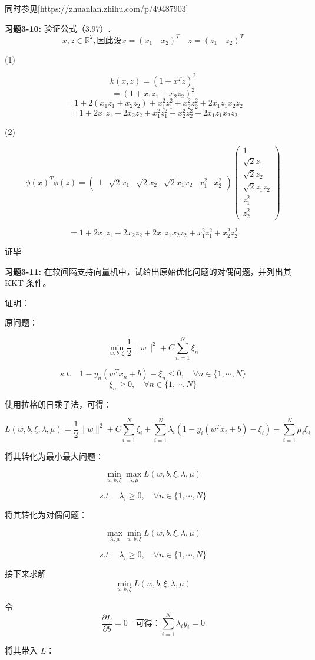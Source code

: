 同时参见[https://zhuanlan.zhihu.com/p/49487903]


\noindent\textbf{习题3-10:} 验证公式（3.97）.
\[x,z \in \mathbb{R}^2, 因此设 x = (x_1 \quad x_2)^T \quad z=(z_1 \quad z_2)^T\]

(1)

\[k(x,z) = (1 + x^Tz)^2\]
\[= (1 + x_1z_1 + x_2z_2)^2\]
\[= 1 + 2(x_1z_1 + x_2z_2) + x_1^2z_1^2 + x_2^2z_2^2 + 2x_1z_1x_2z_2\]
\[= 1 + 2x_1z_1 + 2x_2z_2 + x_1^2z_1^2 + x_2^2z_2^2 + 2x_1z_1x_2z_2\]

(2)

\[\phi(x)^T\phi(z) = \begin{pmatrix} 1 & \sqrt{2}x_1 & \sqrt{2}x_2 & \sqrt{2}x_1x_2 & x_1^2 & x_2^2 \end{pmatrix} \begin{pmatrix} 1 \\ \sqrt{2}z_1 \\ \sqrt{2}z_2 \\ \sqrt{2}z_1z_2 \\ z_1^2 \\ z_2^2 \end{pmatrix}\]

\[= 1 + 2x_1z_1 + 2x_2z_2 + 2x_1z_1x_2z_2 + x_1^2z_1^2 + x_2^2z_2^2\]

证毕


\noindent\textbf{习题3-11:} 在软间隔支持向量机中，试给出原始优化问题的对偶问题，并列出其 KKT 条件。

证明：

原问题：

\[\min_{w,b,\xi} \frac{1}{2}\|w\|^2 + C\sum_{n=1}^N \xi_n\]

\[s.t. \quad 1-y_n(w^Tx_n + b) - \xi_n \leq 0, \quad \forall n \in \{1,\cdots,N\}\]
\[\xi_n \geq 0, \quad \forall n \in \{1,\cdots,N\}\]

使用拉格朗日乘子法，可得：

\[L(w,b,\xi,\lambda,\mu) = \frac{1}{2}\|w\|^2 + C\sum_{i=1}^N \xi_i + \sum_{i=1}^N \lambda_i(1-y_i(w^Tx_i + b) - \xi_i) - \sum_{i=1}^N \mu_i\xi_i\]

将其转化为最小最大问题：

\[\min_{w,b,\xi} \max_{\lambda,\mu} L(w,b,\xi,\lambda,\mu)\]

\[s.t. \quad \lambda_i \geq 0, \quad \forall n \in \{1,\cdots,N\}\]

将其转化为对偶问题：

\[\max_{\lambda,\mu} \min_{w,b,\xi} L(w,b,\xi,\lambda,\mu)\]

\[s.t. \quad \lambda_i \geq 0, \quad \forall n \in \{1,\cdots,N\}\]

接下来求解 \[\min_{w,b,\xi} L(w,b,\xi,\lambda,\mu)\]

令 \[\frac{\partial L}{\partial b} = 0 \quad 可得：\sum_{i=1}^N \lambda_iy_i = 0\]

将其带入 $L$：



